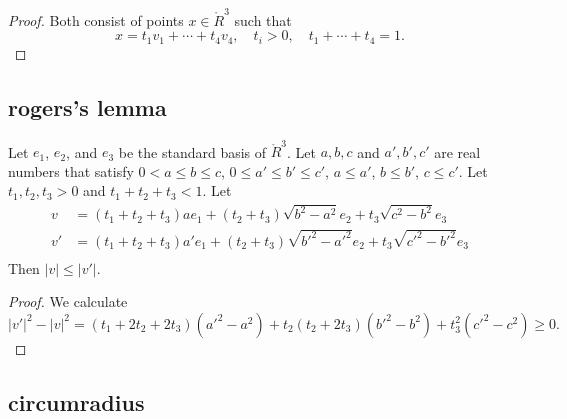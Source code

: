 \begin{tarskidata}
\begin{tarski}
\begin{proof}  Both consist of points $x\in\ring{R}^3$ such that
  $$x = t_1 v_1 +\cdots+ t_4 v_4,\quad t_i> 0,\quad t_1+\cdots +t_4 =1.
  $$
\end{proof}
\end{tarski}






\begin{tarski}
\subsection{rogers's lemma}

\begin{lemma}
Let $e_1$, $e_2$, and $e_3$ be the standard basis of
$\ring{R}^3$.  Let  $a,b,c$ and $a',b',c'$
are real numbers that satisfy $0 <a \le b \le c$, $0 \le a'\le b'\le c'$,
$a \le a'$, $b \le b'$, $c \le c'$. 
Let $t_1,t_2,t_3>0$ and $t_1+t_2+t_3< 1$.  Let
   $$
   \begin{array}{lll}
   v &= (t_1+t_2+t_3) a e_1 + (t_2+t_3) \sqrt{b^2-a^2} e_2 + t_3
   \sqrt{c^2-b^2} e_3\\
   v' &= (t_1+t_2+t_3) a' e_1 + (t_2+t_3) \sqrt{b'^2-a'^2} e_2 + t_3
   \sqrt{c'^2-b'^2} e_3\\
    \end{array}
    $$
    Then $|v| \le |v'|$.
\end{lemma}

\begin{proof}
  We calculate
  $$
  |v'|^2-|v|^2 = (t_1+2t_2+2t_3)(a'^2-a^2) + t_2 (t_2+2t_3)(b'^2-b^2)
    +t_3^2 (c'^2-c^2)\ge0.
  $$
\end{proof}
\end{tarski}






\begin{tarski}
\subsection{circumradius}


\end{tarski}
\end{tarskidata}
